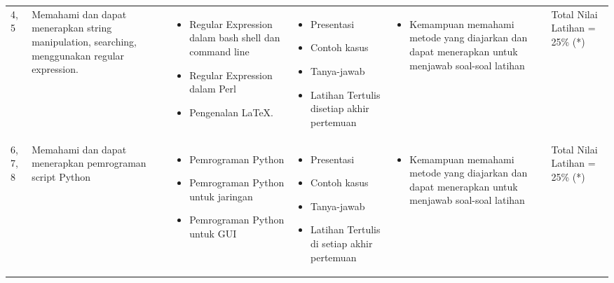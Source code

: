 \documentclass[11pt, a4paper]{article}
\newenvironment{myitemize}
{ \begin{itemize} [label={--},noitemsep,leftmargin=*,topsep=0pt,partopsep=0pt]  }
	{ \end{itemize}  }
\begin{document}
\begin{longtable}{p{1cm}P{3cm}P{3cm}P{3cm}P{3.5cm}P{1.5cm}}
4, 5 & Memahami dan dapat menerapkan string manipulation, searching, menggunakan regular expression. & 
\begin{myitemize}
	\item
	Regular Expression dalam bash shell dan command line
	\item
	Regular Expression dalam Perl
	\item
	Pengenalan LaTeX.
\end{myitemize} & 
\begin{myitemize}
	\item
	Presentasi
	\item
	Contoh kasus
	\item
	Tanya-jawab
	\item
	Latihan Tertulis disetiap akhir pertemuan
\end{myitemize} & 
\begin{myitemize}
	\item Kemampuan memahami metode yang diajarkan dan dapat menerapkan untuk menjawab soal-soal latihan 
\end{myitemize} & 
Total Nilai Latihan = 25\% (*)\\

6, 7, 8 & Memahami dan dapat menerapkan pemrograman script Python &
\begin{myitemize}
	\item
	Pemrograman Python
	\item
	Pemrograman Python untuk jaringan
	\item
	Pemrograman Python untuk GUI
\end{myitemize} &
\begin{myitemize}
	\item
	Presentasi
	\item
	Contoh kasus
	\item
	Tanya-jawab
	\item
	Latihan Tertulis di setiap akhir pertemuan
\end{myitemize} &
\begin{myitemize}
	\item
	Kemampuan memahami metode yang diajarkan dan dapat menerapkan untuk menjawab soal-soal latihan
\end{myitemize} & 
Total Nilai Latihan = 25\% (*) \\


\end{longtable}
\end{document}
